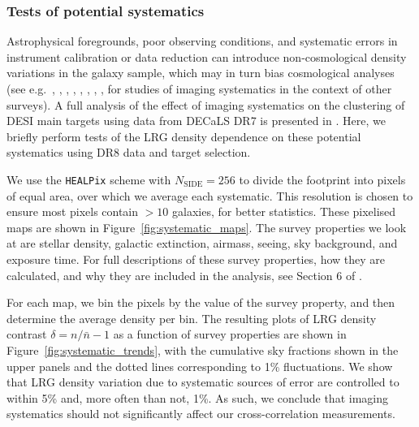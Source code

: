 \documentclass[a4paper,usenatbib]{mnras}
\newcommand{\EK}[1]{\textcolor{red}{#1}}
\begin{document}
\subsubsection{Tests of potential systematics}

Astrophysical foregrounds, poor observing conditions, and systematic errors in instrument calibration or data reduction can introduce non-cosmological density variations in the galaxy sample, which may in turn bias cosmological analyses (see e.g.\ \citealt{Myers06}, \citealt{Crocce11}, \citealt{Ross11}, \citealt{Suchyta++16}, \citealt{Crocce++16}, \citealt{Leistedt++16}, \citealt{ElvinPoole18}, \citealt{Ross20}, \citealt{Weaverdyck20} for studies of imaging systematics in the context of other surveys). A full analysis of the effect of imaging systematics  on the clustering of DESI main targets using data from DECaLS DR7 is presented in \citealt{Kitanidis++19}. Here, we briefly perform tests of the LRG density dependence on these potential systematics using DR8 data and target selection.  

We use the \texttt{HEALPix} scheme with $N_{\text{SIDE}} = 256$ to divide the footprint into pixels of equal area, over which we average each systematic. This resolution is chosen to ensure most pixels contain $>10$ galaxies, for better statistics. These pixelised maps are shown in Figure~\ref{fig:systematic_maps}. The survey properties we look at are stellar density, galactic extinction, airmass, seeing, sky background, and exposure time. For full descriptions of these survey properties, how they are calculated, and why they are included in the analysis, see Section 6 of \citealt{Kitanidis++19}. 

For each map, we bin the pixels by the value of the survey property, and then determine the average density per bin. The resulting plots of LRG density contrast $\delta = n/\bar{n} - 1$ as a function of survey properties are shown in Figure~\ref{fig:systematic_trends}, with the cumulative sky fractions shown in the upper panels and the dotted lines corresponding to 1\% fluctuations. We show that LRG density variation due to systematic sources of error are controlled to within 5\% and, more often than not, 1\%. As such, we conclude that imaging systematics should not significantly affect our cross-correlation measurements.

\end{document}
